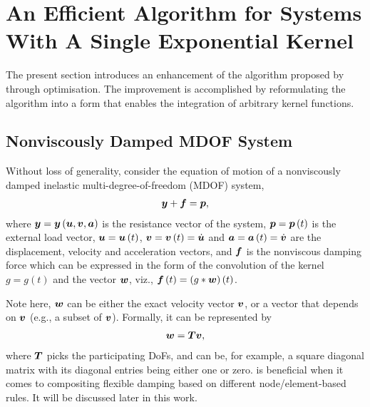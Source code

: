 \section{An Efficient Algorithm for Systems With A Single Exponential Kernel}\label{sec:single}
The present section introduces an enhancement of the algorithm proposed by \citet{Adhikari2004} through optimisation. The improvement is accomplished by reformulating the algorithm into a form that enables the integration of arbitrary kernel functions.
\subsection{Nonviscously Damped MDOF System}
Without loss of generality, consider the equation of motion of a nonviscously damped inelastic multi-degree-of-freedom (MDOF) system,
\begin{gather}\label{eq:eom}
\bm{y}+\bm{f}=\bm{p},
\end{gather}
where $\bm{y}=\bm{y}\left(\bm{u},\bm{v},\bm{a}\right)$ is the resistance vector of the system, $\bm{p}=\bm{p}\left(t\right)$ is the external load vector, $\bm{u}=\bm{u}\left(t\right)$, $\bm{v}=\bm{v}\left(t\right)=\dot{\bm{u}}$ and $\bm{a}=\bm{a}\left(t\right)=\dot{\bm{v}}$ are the displacement, velocity and acceleration vectors, and $\bm{f}$ is the nonviscous damping force which can be expressed in the form of the convolution of the kernel $g=g\left(t\right)$ and the vector $\bm{w}$, viz., $\bm{f}\left(t\right)=\left(g*\bm{w}\right)\left(t\right)$.

Note here, $\bm{w}$ can be either the exact velocity vector $\bm{v}$, or a vector that depends on $\bm{v}$ (e.g., a subset of $\bm{v}$). Formally, it can be represented by
\begin{gather}\label{eq:wv}
\bm{w}=\bm{T}\bm{v},
\end{gather}
where $\bm{T}$ picks the participating DoFs, and can be, for example, a square diagonal matrix with its diagonal entries being either one or zero.  is beneficial when it comes to compositing flexible damping based on different node/element-based rules. It will be discussed later in this work.
